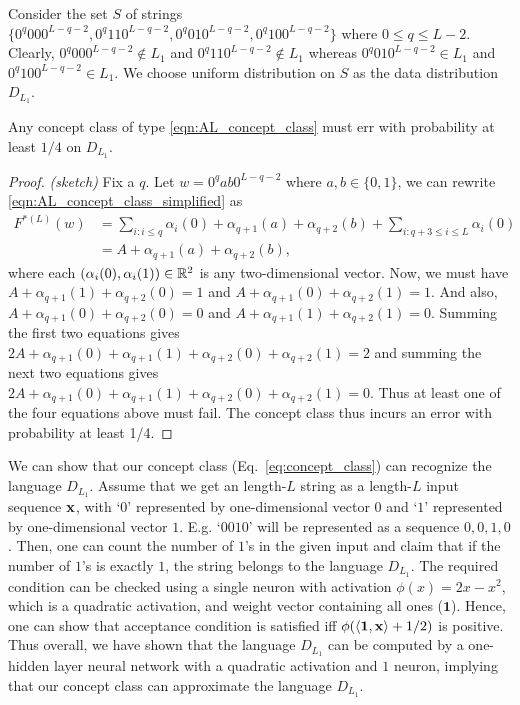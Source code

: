 Consider the set $S$ of strings $\{0^q 00 0^{L-q-2}, 0^q 11 0^{L-q-2}, 0^q 01 0^{L-q-2}, 0^q 10 0^{L-q-2}\}$ where $0 \leq q \leq L-2$. 
Clearly, $0^q 00 0^{L-q-2} \notin L_1$ and $0^q 11 0^{L-q-2} \notin L_1$ whereas $0^q 01 0^{L-q-2} \in L_1$ and $0^q 10 0^{L-q-2} \in L_1$.
We choose uniform distribution on $S$ as the data distribution $D_{L_1}$. 
\begin{theorem}\label{thm:allencantdl1}
Any concept class of type \eqref{eqn:AL_concept_class} must err with probability at least $1/4$ on $D_{L_1}$.
\end{theorem}
\begin{proof}\emph{(sketch)} 
Fix a $q$. Let $w=0^q a b 0^{L-q-2}$ where $a, b \in \{0, 1\}$, we can rewrite \eqref{eqn:AL_concept_class_simplified} as 
\begin{align*}
    F^{\ast (L)}(w) &= 
    \sum_{i : i \leq q } \alpha_i(0) +  \alpha_{q+1}(a) + \alpha_{q+2}(b) + \sum_{i : q+3 \leq i \leq L } \alpha_i(0) \\
    &= A + \alpha_{q+1}(a) + \alpha_{q+2}(b),
\end{align*}
where each $(\alpha_i(0), \alpha_i(1)) \in \mathbb{R}^2$ is any two-dimensional vector.
Now, we must have $A + \alpha_{q+1}(1) + \alpha_{q+2}(0) = 1$ and $A + \alpha_{q+1}(0) + \alpha_{q+2}(1) = 1$. And also,
$A + \alpha_{q+1}(0) + \alpha_{q+2}(0) = 0$ and $A + \alpha_{q+1}(1) + \alpha_{q+2}(1) = 0$. Summing the first two equations gives
$2A +  \alpha_{q+1}(0)  + \alpha_{q+1}(1) + \alpha_{q+2}(0) + \alpha_{q+2}(1) = 2$ and summing the next two equations gives
$2A +  \alpha_{q+1}(0)  + \alpha_{q+1}(1) + \alpha_{q+2}(0) + \alpha_{q+2}(1) = 0$. Thus at least one of the four equations above must fail.
The concept class thus incurs an error with probability at least 1/4.
\end{proof}


We can show that our concept class (Eq.~\eqref{eq:concept_class}) can recognize the language $D_{L_1}$. Assume that we get an length-$L$ string as a length-$L$ input sequence $\mathbf{x}$, with `$0$' represented by one-dimensional vector $0$ and `$1$' represented by one-dimensional vector $1$. E.g. `$0010$' will be represented as a sequence $0,0,1,0$. Then, one can count the number of $1$'s in the given input and claim that if the number of $1$'s is exactly $1$, the string belongs to the language $D_{L_1}$. The required condition can be checked using a single neuron with activation $\phi(x) = 2x - x^2$, which is a quadratic activation, and weight vector containing all ones ($\mathbf{1}$).  Hence, one can show that acceptance condition is satisfied iff $\phi(\langle\mathbf{1}, \mathbf{x}\rangle + 1/2)$ is positive. Thus overall, we have shown that the language $D_{L_1}$ can be computed by a one-hidden layer neural network with a quadratic activation and $1$ neuron, implying that our concept class can approximate the language $D_{L_1}$.


